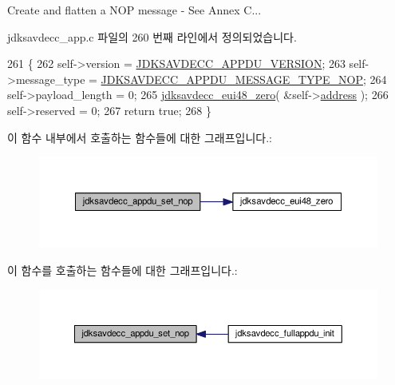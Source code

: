 Create and flatten a N\+OP message -\/ See Annex C... 

jdksavdecc\+\_\+app.\+c 파일의 260 번째 라인에서 정의되었습니다.


\begin{DoxyCode}
261 \{
262     \textcolor{keyword}{self}->version = \hyperlink{group__appdu__constants_ga56dc385655e74f514e98341140261880}{JDKSAVDECC\_APPDU\_VERSION};
263     \textcolor{keyword}{self}->message\_type = \hyperlink{group__appdu__constants_ga5046c58fc443b2e4ceff64635aa0ba8c}{JDKSAVDECC\_APPDU\_MESSAGE\_TYPE\_NOP};
264     \textcolor{keyword}{self}->payload\_length = 0;
265     \hyperlink{group__eui48_ga442d51d426fa9ba3fc3ffa24fbfbd115}{jdksavdecc\_eui48\_zero}( &self->\hyperlink{structjdksavdecc__appdu_a58564d10e6bb944368888630d011b003}{address} );
266     \textcolor{keyword}{self}->reserved = 0;
267     \textcolor{keywordflow}{return} \textcolor{keyword}{true};
268 \}
\end{DoxyCode}


이 함수 내부에서 호출하는 함수들에 대한 그래프입니다.\+:
\nopagebreak
\begin{figure}[H]
\begin{center}
\leavevmode
\includegraphics[width=350pt]{group__app_ga52e522c2aef1022cff142ea52856dc15_cgraph}
\end{center}
\end{figure}




이 함수를 호출하는 함수들에 대한 그래프입니다.\+:
\nopagebreak
\begin{figure}[H]
\begin{center}
\leavevmode
\includegraphics[width=350pt]{group__app_ga52e522c2aef1022cff142ea52856dc15_icgraph}
\end{center}
\end{figure}


